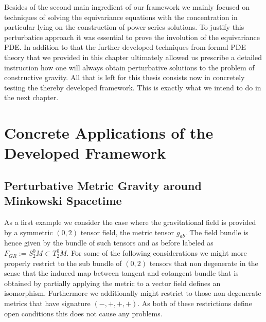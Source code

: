 \documentclass[a4paper,12pt, DIV=14, BCOR=5mm, twoside, headsepline]{scrbook}
\begin{document}
Besides of the second main ingredient of our framework we mainly focused on techniques of solving the equivariance equations with the concentration in particular lying on the construction of power series solutions. To justify this perturbatice approach it was essential to prove the involution of the equivariance PDE. In addition to that the further developed techniques from formal PDE theory that we provided in this chapter ultimately allowed us prescribe a detailed instruction how one will always obtain perturbative solutions to the problem of constructive gravity.  All that is left for this thesis consists now in concretely testing the thereby developed framework. This is exactly what we intend to do in the next chapter.


\chapter{Concrete Applications of the Developed Framework}
\section{Perturbative Metric Gravity around Minkowski Spacetime}
As a first example we consider the case where the gravitational field is provided by a symmetric $(0,2)$ tensor field, the metric tensor $g_{ab}$. The field bundle is hence given by the bundle of such tensors and as before labeled as $F_{GR} := S^0_2M \subset T^0_2M$. For some of the following considerations we might more properly restrict to the sub bundle of $(0,2)$ tensors that non degenerate in the sense that the induced map between tangent and cotangent bundle that is obtained by partially applying the metric to a vector field defines an isomorphism. Furthermore we additionally might restrict to those non degenerate metrics that have signature $(-,+,+,+)$. As both of these restrictions define open conditions this does not cause any problems.
\end{document}
